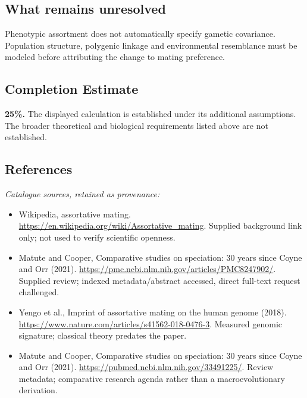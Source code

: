 \documentclass[11pt]{article}
\begin{document}
\subsection{What remains unresolved}
Phenotypic assortment does not automatically specify gametic covariance. Population structure, polygenic linkage and environmental resemblance must be modeled before attributing the change to mating preference.
\subsection{Completion Estimate}
\textbf{25\%.} The displayed calculation is established under its additional assumptions. The broader theoretical and biological requirements listed above are not established.
\subsection{References}
\noindent\emph{Catalogue sources, retained as provenance:}
\begin{itemize}
\item Wikipedia, assortative mating. \url{https://en.wikipedia.org/wiki/Assortative_mating}. Supplied background link only; not used to verify scientific openness.
\item Matute and Cooper, Comparative studies on speciation: 30 years since Coyne and Orr (2021). \url{https://pmc.ncbi.nlm.nih.gov/articles/PMC8247902/}. Supplied review; indexed metadata/abstract accessed, direct full-text request challenged.
\item Yengo et al., Imprint of assortative mating on the human genome (2018). \url{https://www.nature.com/articles/s41562-018-0476-3}. Measured genomic signature; classical theory predates the paper.
\item Matute and Cooper, Comparative studies on speciation: 30 years since Coyne and Orr (2021). \url{https://pubmed.ncbi.nlm.nih.gov/33491225/}. Review metadata; comparative research agenda rather than a macroevolutionary derivation.
\end{itemize}
\end{document}
